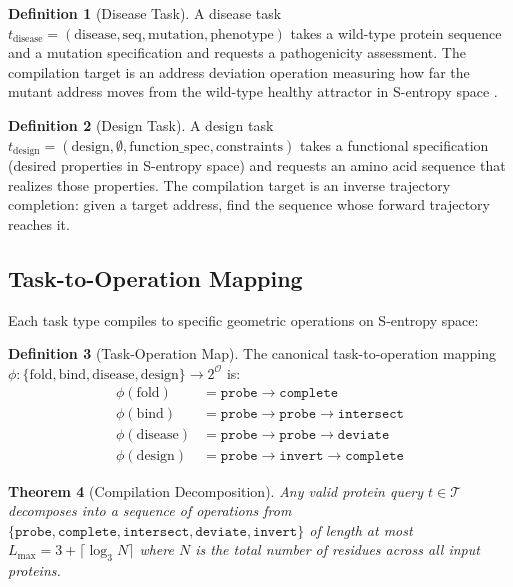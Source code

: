 \documentclass[11pt,twocolumn,a4paper]{article}
\newtheorem{theorem}{Theorem}[section]
\theoremstyle{definition}
\newtheorem{definition}[theorem]{Definition}
\theoremstyle{remark}
\newcommand{\taskspace}{\mathcal{T}}
\newcommand{\opspace}{\mathcal{O}}
\begin{document}
\begin{definition}[Disease Task]
\label{def:disease_task}
A disease task $t_{\text{disease}} = (\text{disease}, \text{seq}, \text{mutation}, \text{phenotype})$ takes a wild-type protein sequence and a mutation specification and requests a pathogenicity assessment. The compilation target is an address deviation operation measuring how far the mutant address moves from the wild-type healthy attractor in S-entropy space \citep{sachikonye2025e}.
\end{definition}

\begin{definition}[Design Task]
\label{def:design_task}
A design task $t_{\text{design}} = (\text{design}, \emptyset, \text{function\_spec}, \text{constraints})$ takes a functional specification (desired properties in S-entropy space) and requests an amino acid sequence that realizes those properties. The compilation target is an inverse trajectory completion: given a target address, find the sequence whose forward trajectory reaches it.
\end{definition}

\subsection{Task-to-Operation Mapping}

Each task type compiles to specific geometric operations on S-entropy space:

\begin{definition}[Task-Operation Map]
\label{def:task_op_map}
The canonical task-to-operation mapping $\phi: \{\text{fold}, \text{bind}, \text{disease}, \text{design}\} \to 2^{\opspace}$ is:
\begin{align}
\phi(\text{fold}) &= \texttt{probe} \to \texttt{complete} \\
\phi(\text{bind}) &= \texttt{probe} \to \texttt{probe} \to \texttt{intersect} \\
\phi(\text{disease}) &= \texttt{probe} \to \texttt{probe} \to \texttt{deviate} \\
\phi(\text{design}) &= \texttt{probe} \to \texttt{invert} \to \texttt{complete}
\end{align}
\end{definition}

\begin{theorem}[Compilation Decomposition]
\label{thm:compilation_decomposition}
Any valid protein query $t \in \taskspace$ decomposes into a sequence of operations from $\{\texttt{probe}, \texttt{complete}, \texttt{intersect}, \texttt{deviate}, \texttt{invert}\}$ of length at most $L_{\max} = 3 + \lceil \log_3 N \rceil$ where $N$ is the total number of residues across all input proteins.
\end{theorem}
\end{document}
